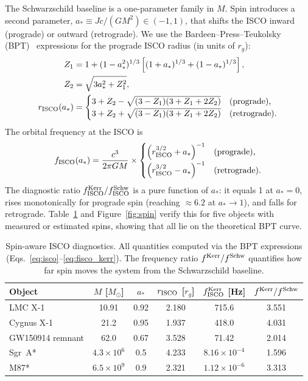 \documentclass[11pt]{article}
\begin{document}
The Schwarzschild baseline is a one-parameter family in $M$.
Spin introduces a second parameter, $a_* \equiv Jc/(GM^2) \in (-1,1)$, that shifts the ISCO inward (prograde) or outward (retrograde).
We use the Bardeen--Press--Teukolsky (BPT)~\cite{BardeenPressTeukolsky1972} expressions for the prograde ISCO radius (in units of $r_g$):
\begin{align}
Z_1 &= 1 + (1-a_*^2)^{1/3}\left[(1+a_*)^{1/3}+(1-a_*)^{1/3}\right], \nonumber\\
Z_2 &= \sqrt{3a_*^2+Z_1^2}, \nonumber\\
r_{\rm ISCO}(a_*) &=
\begin{cases}
3+Z_2-\sqrt{(3-Z_1)(3+Z_1+2Z_2)} & \text{(prograde),}\\
3+Z_2+\sqrt{(3-Z_1)(3+Z_1+2Z_2)} & \text{(retrograde).}
\end{cases}\label{eq:isco}
\end{align}
The orbital frequency at the ISCO is
\begin{equation}
f_{\rm ISCO}(a_*) = \frac{c^3}{2\pi GM}\times
\begin{cases}
\left(r_{\rm ISCO}^{3/2}+a_*\right)^{-1} & \text{(prograde),}\\[4pt]
\left(r_{\rm ISCO}^{3/2}-a_*\right)^{-1} & \text{(retrograde).}
\end{cases}\label{eq:fisco_kerr}
\end{equation}
The diagnostic ratio $f_{\rm ISCO}^{\rm Kerr}/f_{\rm ISCO}^{\rm Schw}$ is a pure function of $a_*$: it equals 1 at $a_*=0$, rises monotonically for prograde spin (reaching $\approx 6.2$ at $a_*\to 1$), and falls for retrograde.
Table~\ref{tab:spin} and Figure~\ref{fig:spin} verify this for five objects with measured or estimated spins, showing that all lie on the theoretical BPT curve.

\begin{table}[htbp]
\centering
\caption{Spin-aware ISCO diagnostics.
All quantities computed via the BPT expressions (Eqs.~\ref{eq:isco}--\ref{eq:fisco_kerr}).
The frequency ratio $f^{\rm Kerr}/f^{\rm Schw}$ quantifies how far spin moves the system from the Schwarzschild baseline.}
\label{tab:spin}
\begin{tabular}{@{}lccccc@{}}
\toprule
Object & $M$ [$M_\odot$] & $a_*$ & $r_{\rm ISCO}$ [$r_g$] & $f_{\rm ISCO}^{\rm Kerr}$ [Hz] & $f^{\rm Kerr}/f^{\rm Schw}$ \\
\midrule
LMC X-1     & 10.91 & 0.92 & 2.180 & 715.6 & 3.551 \\
Cygnus X-1  & 21.2 & 0.95 & 1.937 & 418.0 & 4.031 \\
GW150914 remnant & 62.0 & 0.67 & 3.528 & 71.42 & 2.014 \\
Sgr~A*      & $4.3\!\times\! 10^{6}$ & 0.5 & 4.233 & $8.16\!\times\! 10^{-4}$ & 1.596 \\
M87*        & $6.5\!\times\! 10^{9}$ & 0.9 & 2.321 & $1.12\!\times\! 10^{-6}$ & 3.313 \\
\bottomrule
\end{tabular}
\end{table}
\end{document}
